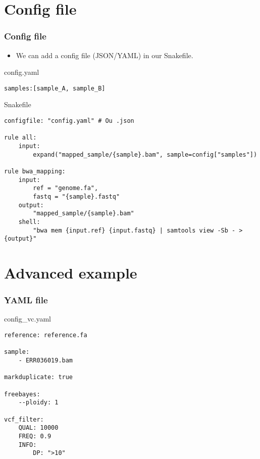 \documentclass{beamer}
\begin{document}
\section{Config file}

\begin{frame}[fragile]
    \frametitle{Config file}
    \begin{itemize}
        \item We can add a config file (JSON/YAML) in our Snakefile.
    \end{itemize}
    \begin{block}{config.yaml}
        \begin{lstlisting}
samples:[sample_A, sample_B]
        \end{lstlisting}
    \end{block}
    \begin{block}{Snakefile}
    \begin{lstlisting}
configfile: "config.yaml" # Ou .json

rule all:
    input:
        expand("mapped_sample/{sample}.bam", sample=config["samples"])

rule bwa_mapping:
    input:
        ref = "genome.fa",
        fastq = "{sample}.fastq"
    output:
        "mapped_sample/{sample}.bam"
    shell:
        "bwa mem {input.ref} {input.fastq} | samtools view -Sb - > {output}"
    \end{lstlisting}
    \end{block}
\end{frame}

\section{Advanced example}

\begin{frame}[fragile]
    \frametitle{YAML file}
    \begin{block}{config\_vc.yaml}
    \begin{lstlisting}
reference: reference.fa

sample: 
    - ERR036019.bam

markduplicate: true

freebayes:
    --ploidy: 1

vcf_filter:
    QUAL: 10000
    FREQ: 0.9
    INFO:
        DP: ">10"
    \end{lstlisting}
    \end{block}
\end{frame}
\end{document}
